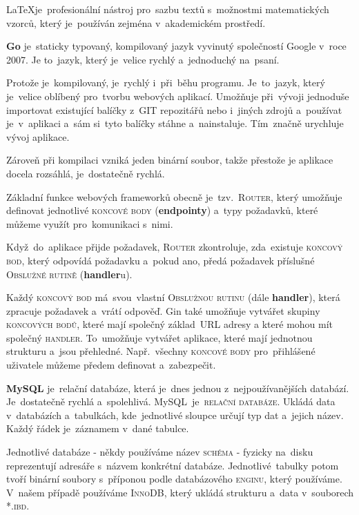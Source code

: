 \documentclass[14pt,a4paper]{article}
\begin{document}
            \LaTeX je~profesionální nástroj pro~sazbu textů s~možnostmi matematických vzorců, který je~používán zejména v~akademickém prostředí.\parencite{Rybicka2003:latex}

            \textbf{Go} je~staticky typovaný, kompilovaný jazyk vyvinutý společností Google v~roce 2007. Je to~jazyk, který je~velice rychlý a~jednoduchý na~psaní.

            Protože je~kompilovaný, je~rychlý i~při~běhu programu. Je~to~jazyk, který je~velice oblíbený pro~tvorbu webových aplikací. Umožňuje při~vývoji jednoduše importovat existující balíčky z~GIT repozitářů nebo i~jiných zdrojů a~používat je~v~aplikaci a~sám si~tyto balíčky stáhne a~nainstaluje. Tím~značně urychluje vývoj aplikace.

            Zároveň při kompilaci vzniká jeden binární soubor, takže přestože je aplikace docela rozsáhlá, je~dostatečně rychlá.

            Základní funkce webových frameworků obecně je~tzv.~\textsc{Router}, který umožňuje definovat jednotlivé \textsc{koncové body} (\textbf{endpointy}) a~typy požadavků, které můžeme využít pro~komunikaci s~nimi.
            
            Když~do~aplikace přijde požadavek, \textsc{Router} zkontroluje, zda~existuje \textsc{koncový bod}, který odpovídá požadavku a~pokud ano, předá požadavek příslušné \textsc{Obslužné rutině} (\textbf{handler}u).

            Každý \textsc{koncový bod} má~svou~vlastní \textsc{Obslužnou rutinu} (dále \textbf{handler}), která zpracuje požadavek a~vrátí odpověď.
            Gin také umožňuje vytvářet skupiny \textsc{koncových bodů}, které mají společný základ~URL adresy a které mohou mít společný \textsc{handler}.
            To~umožňuje vytvářet aplikace, které mají jednotnou strukturu a~jsou přehledné. Např.~všechny \textsc{koncové body} pro~přihlášené
            uživatele můžeme předem definovat a~zabezpečit.
            
            \textbf{MySQL} je~relační databáze, která je~dnes jednou z~nejpoužívanějších databází. Je~dostatečně rychlá a~spolehlivá. \parencite{databases21}
            MySQL~je~\textsc{relační databáze}. Ukládá data v~databázích a~tabulkách, kde~jednotlivé sloupce určují typ dat a~jejich název. Každý řádek je~záznamem v~dané tabulce.
            
            Jednotlivé databáze - někdy používáme název \textsc{schéma} - fyzicky na~disku reprezentují adresáře s~názvem konkrétní databáze. Jednotlivé~tabulky potom tvoří binární soubory s~příponou podle databázového \textsc{enginu}, který používáme. V~našem případě používáme \textsc{InnoDB}, který ukládá strukturu a~data v~souborech \textsc{*.ibd}. \parencite{MySQLInnoDB}
            
\end{document}
